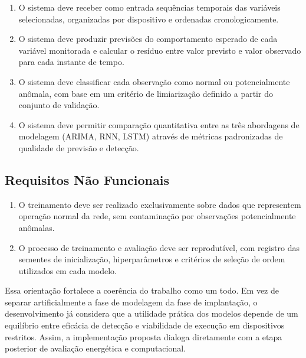 \begin{enumerate}

    \item[RF1.] O sistema deve receber como entrada sequências temporais das 
    variáveis selecionadas, organizadas por dispositivo e ordenadas 
    cronologicamente.

    \item[RF2.] O sistema deve produzir previsões do comportamento esperado de 
    cada variável monitorada e calcular o resíduo entre valor previsto e 
    valor observado para cada instante de tempo.

    \item[RF3.] O sistema deve classificar cada observação como normal ou 
    potencialmente anômala, com base em um critério de limiarização definido 
    a partir do conjunto de validação.

    \item[RF4.] O sistema deve permitir comparação quantitativa entre as três 
    abordagens de modelagem (ARIMA, RNN, LSTM) através de métricas 
    padronizadas de qualidade de previsão e detecção.

\end{enumerate}



\subsection{Requisitos Não Funcionais}

\begin{enumerate}

    \item[RNF1.] O treinamento deve ser realizado exclusivamente sobre dados que 
    representem operação normal da rede, sem contaminação por observações 
    potencialmente anômalas.

    \item[RNF2.] O processo de treinamento e avaliação deve ser reprodutível, com 
    registro das sementes de inicialização, hiperparâmetros e critérios de 
    seleção de ordem utilizados em cada modelo.

\end{enumerate}

Essa orientação fortalece a coerência do trabalho como um todo. Em vez de separar artificialmente a fase de modelagem da fase de implantação, o desenvolvimento já considera que a utilidade prática dos modelos depende de um equilíbrio entre eficácia de detecção e viabilidade de execução em dispositivos restritos. Assim, a implementação proposta dialoga diretamente com a etapa posterior de avaliação energética e computacional.


